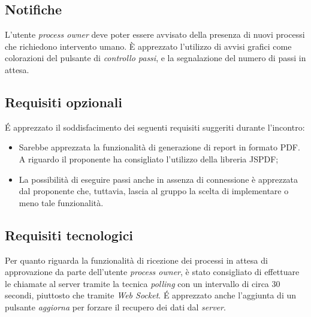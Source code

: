\subsection{Notifiche}
L'utente \textit{process owner} deve poter essere avvisato della presenza di nuovi processi che richiedono intervento umano. È apprezzato l'utilizzo di avvisi grafici come colorazioni del pulsante di \textit{controllo passi}, e la segnalazione del numero di passi in attesa.

\subsection{Requisiti opzionali}
É apprezzato il soddisfacimento dei seguenti requisiti suggeriti durante l'incontro:
\begin{itemize}
	\item Sarebbe apprezzata la funzionalità di generazione di report in formato PDF. A riguardo il 	proponente ha consigliato l'utilizzo della libreria JSPDF;
	\item La possibilità di eseguire passi anche in assenza di connessione è apprezzata dal proponente che, tuttavia, lascia al gruppo la scelta di implementare o meno tale funzionalità.
\end{itemize}


\subsection{Requisiti tecnologici}
Per quanto riguarda la funzionalità di ricezione dei processi in attesa di approvazione da parte dell'utente \textit{process owner}, è stato consigliato di effettuare le chiamate al server tramite la tecnica \textit{polling} con un intervallo di circa 30 secondi, piuttosto che tramite \textit{Web Socket}. É apprezzato  anche l'aggiunta di un pulsante \textit{aggiorna} per forzare il recupero dei dati dal \textit{server}.
